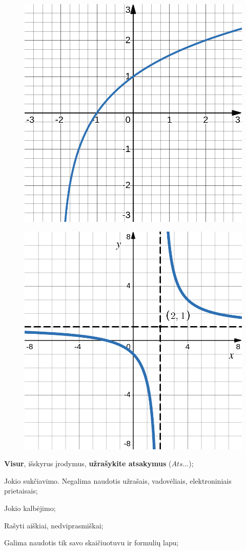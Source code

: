 \documentclass[a4paper]{article}
\begin{document}
\begin{enumerate}
\begin{figure}[!htpb]
\begin{minipage}[]{0.5\linewidth}
                        \includegraphics[width=0.5\linewidth]{images/func_1.png}
                        \label{fig:test1}
                  \end{minipage}%
                  \begin{minipage}{.5\textwidth}
                        \centering
                        \includegraphics[width=0.5\linewidth]{images/func_2.png}
                        \label{fig:test2}
                  \end{minipage}
            \end{figure}
\end{enumerate}

\begin{small}
      \begin{enumerate*}[label={(\arabic*)}, topsep=0pt, partopsep=0pt]
            \item \textbf{Visur}, išskyrus įrodymus, \textbf{užrašykite
                  atsakymus} ($Ats\ldots$);
            \item Jokio sukčiavimo. Negalima naudotis užrašais, vadovėliais,
            elektroniniais prietaisais;
            \item Jokio kalbėjimo;
            \item Rašyti aiškiai, nedviprasmiškai;
            \item Galima naudotis tik savo skaičiuotuvu ir formulių lapu;
      \end{enumerate*}
\end{small}
\end{document}
